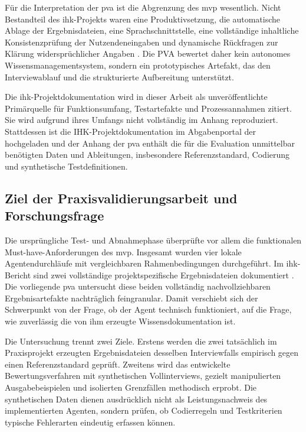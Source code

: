 \documentclass[
  10pt,
  ngerman,
  a4paper,
  toc=graduated,
  numbers=noenddot,
  headings=standardclasses,
  nonumberlist
]{scrartcl}
\begin{document}
Für die Interpretation der \gls{pva} ist die Abgrenzung des \gls{mvp} wesentlich. Nicht Bestandteil des \acrshort{ihk}-Projekts waren eine Produktivsetzung, die automatische Ablage der Ergebnisdateien, eine Sprachschnittstelle, eine vollständige inhaltliche Konsistenzprüfung der Nutzendeneingaben und dynamische Rückfragen zur Klärung widersprüchlicher Angaben \cite[S.~2,~5]{sommer2026projekt}. Die PVA bewertet daher kein autonomes Wissensmanagementsystem, sondern ein prototypisches Artefakt, das den Interviewablauf und die strukturierte Aufbereitung unterstützt.

Die \acrshort{ihk}-Projektdokumentation wird in dieser Arbeit als unveröffentlichte Primärquelle für Funktionsumfang, Testartefakte und Prozessannahmen zitiert. Sie wird aufgrund ihres Umfangs nicht vollständig im Anhang reproduziert. Stattdessen ist die IHK-Projektdokumentation im Abgabenportal der  hochgeladen und der Anhang der \gls{pva} enthält die für die Evaluation unmittelbar benötigten Daten und Ableitungen, insbesondere Referenzstandard, Codierung und synthetische Testdefinitionen.

\subsection{Ziel der Praxisvalidierungsarbeit und Forschungsfrage}

Die ursprüngliche Test- und Abnahmephase überprüfte vor allem die funktionalen Must-have-An\-forderungen des \gls{mvp}. Insgesamt wurden vier lokale Agentendurchläufe mit vergleichbaren Rahmenbedingungen durchgeführt. Im \acrshort{ihk}-Bericht sind zwei vollständige projektspezifische Ergebnisdateien dokumentiert \cite[S.~13]{sommer2026projekt}. Die vorliegende \gls{pva} untersucht diese beiden vollständig nachvollziehbaren Ergebnisartefakte nachträglich feingranular. Damit verschiebt sich der Schwerpunkt von der Frage, ob der Agent technisch funktioniert, auf die Frage, wie zuverlässig die von ihm erzeugte Wissensdokumentation ist.

Die Untersuchung trennt zwei Ziele. Erstens werden die zwei tatsächlich im Praxisprojekt erzeugten Ergebnisdateien desselben Interviewfalls empirisch gegen einen Referenzstandard geprüft. Zweitens wird das entwickelte Bewertungsverfahren mit synthetischen Vollinterviews, gezielt manipulierten Ausgabebeispielen und isolierten Grenzfällen methodisch erprobt. Die synthetischen Daten dienen ausdrücklich nicht als Leistungsnachweis des implementierten Agenten, sondern prüfen, ob Codierregeln und Testkriterien typische Fehlerarten eindeutig erfassen können.
\end{document}
